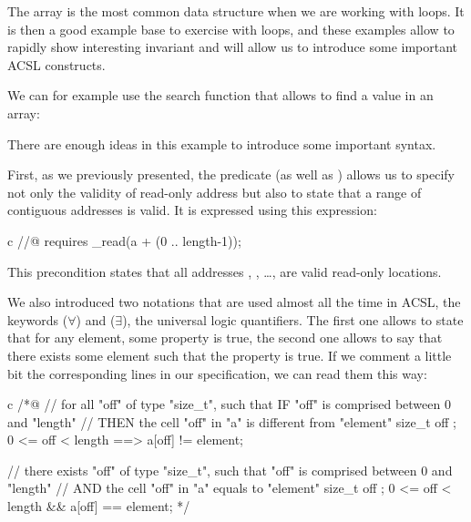 

The array is the most common data structure when we are working with loops.
It is then a good example base to exercise with loops, and these
examples allow to rapidly show interesting invariant and will allow us
to introduce some important ACSL constructs.



We can for example use the search function that allows to find a value
in an array:





There are enough ideas in this example to introduce some important syntax.



First, as we previously presented, the
 predicate (as well as
) allows us to specify not only the
validity of read-only address but also to state that a range of
contiguous addresses is valid. It is expressed using this expression:



\begin{CodeBlock}{c}
//@ requires \valid_read(a + (0 .. length-1));
\end{CodeBlock}



This precondition states that all addresses ,
, \ldots{},  are valid read-only
locations.



We also introduced two notations that are used almost all the time in
ACSL, the keywords  ($\forall$) and
 ($\exists$), the universal logic
quantifiers. The first one allows to state that for any element, some
property is true, the second one allows to say that there exists some
element such that the property is true. If we comment a little bit the
corresponding lines in our specification, we can read them this way:


\begin{CodeBlock}{c}
/*@
// for all "off" of type "size_t", such that IF "off" is comprised between 0 and "length"
//                                 THEN the cell "off" in "a" is different from "element"
\forall size_t off ; 0 <= off < length ==> a[off] != element;

// there exists "off" of type "size_t", such that "off" is comprised between 0 and "length"
//                                      AND the cell "off" in "a" equals to "element"
\exists size_t off ; 0 <= off < length && a[off] == element;
*/
\end{CodeBlock}



